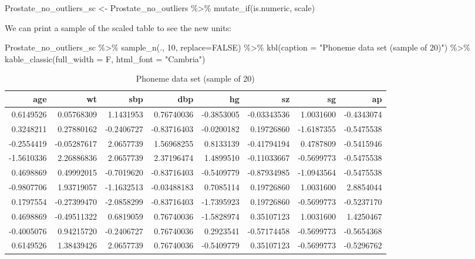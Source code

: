 \documentclass[
]{article}
\newenvironment{Shaded}{\begin{snugshade}}{\end{snugshade}}
\newcommand{\AttributeTok}[1]{\textcolor[rgb]{0.77,0.63,0.00}{#1}}
\newcommand{\ConstantTok}[1]{\textcolor[rgb]{0.00,0.00,0.00}{#1}}
\newcommand{\DecValTok}[1]{\textcolor[rgb]{0.00,0.00,0.81}{#1}}
\newcommand{\FunctionTok}[1]{\textcolor[rgb]{0.00,0.00,0.00}{#1}}
\newcommand{\NormalTok}[1]{#1}
\newcommand{\OtherTok}[1]{\textcolor[rgb]{0.56,0.35,0.01}{#1}}
\newcommand{\SpecialCharTok}[1]{\textcolor[rgb]{0.00,0.00,0.00}{#1}}
\newcommand{\StringTok}[1]{\textcolor[rgb]{0.31,0.60,0.02}{#1}}
\begin{document}
\begin{Shaded}
\begin{Highlighting}[]
\NormalTok{Prostate\_no\_outliers\_sc }\OtherTok{\textless{}{-}}\NormalTok{ Prostate\_no\_outliers }\SpecialCharTok{\%\textgreater{}\%}
        \FunctionTok{mutate\_if}\NormalTok{(is.numeric, scale)}
\end{Highlighting}
\end{Shaded}

We can print a sample of the scaled table to see the new units:

\begin{Shaded}
\begin{Highlighting}[]
\NormalTok{Prostate\_no\_outliers\_sc }\SpecialCharTok{\%\textgreater{}\%}
  \FunctionTok{sample\_n}\NormalTok{(., }\DecValTok{10}\NormalTok{, }\AttributeTok{replace=}\ConstantTok{FALSE}\NormalTok{) }\SpecialCharTok{\%\textgreater{}\%} 
  \FunctionTok{kbl}\NormalTok{(}\AttributeTok{caption =} \StringTok{"Phoneme data set (sample of 20)"}\NormalTok{) }\SpecialCharTok{\%\textgreater{}\%}
  \FunctionTok{kable\_classic}\NormalTok{(}\AttributeTok{full\_width =}\NormalTok{ F, }\AttributeTok{html\_font =} \StringTok{"Cambria"}\NormalTok{)}
\end{Highlighting}
\end{Shaded}

\begin{table}

\caption{\label{tab:unnamed-chunk-30}Phoneme data set (sample of 20)}
\centering
\begin{tabular}[t]{r|r|r|r|r|r|r|r}
\hline
age & wt & sbp & dbp & hg & sz & sg & ap\\
\hline
0.6149526 & 0.05768309 & 1.1431953 & 0.76740036 & -0.3853005 & -0.03343536 & 1.0031600 & -0.4343074\\
\hline
0.3248211 & 0.27880162 & -0.2406727 & -0.83716403 & -0.0200182 & 0.19726860 & -1.6187355 & -0.5475538\\
\hline
-0.2554419 & -0.05287617 & 2.0657739 & 1.56968255 & 0.8133139 & -0.41794194 & 0.4787809 & -0.5415946\\
\hline
-1.5610336 & 2.26886836 & 2.0657739 & 2.37196474 & 1.4899510 & -0.11033667 & -0.5699773 & -0.5475538\\
\hline
0.4698869 & 0.49992015 & -0.7019620 & -0.83716403 & -0.5409779 & -0.87934985 & -1.0943564 & -0.5475538\\
\hline
-0.9807706 & 1.93719057 & -1.1632513 & -0.03488183 & 0.7085114 & 0.19726860 & 1.0031600 & 2.8854044\\
\hline
0.1797554 & -0.27399470 & -2.0858299 & -0.83716403 & -1.7395923 & 0.19726860 & -0.5699773 & -0.5237170\\
\hline
0.4698869 & -0.49511322 & 0.6819059 & 0.76740036 & -1.5828974 & 0.35107123 & 1.0031600 & 1.4250467\\
\hline
-0.4005076 & 0.94215720 & -0.2406727 & 0.76740036 & 0.2923541 & -0.57174458 & -0.5699773 & -0.5654368\\
\hline
0.6149526 & 1.38439426 & 2.0657739 & 0.76740036 & -0.5409779 & 0.35107123 & -0.5699773 & -0.5296762\\
\hline
\end{tabular}
\end{table}
\end{document}

